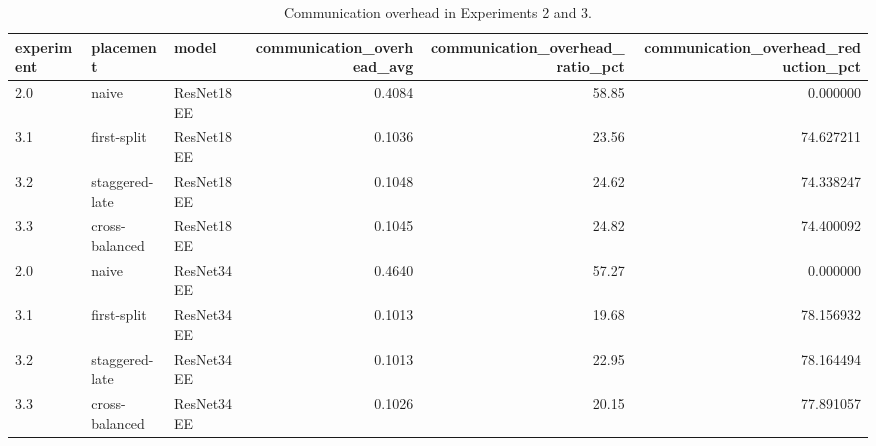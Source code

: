 \begin{table}
\centering
\caption{Communication overhead in Experiments 2 and 3.}
\label{tab:exp2-exp3-communication-overhead}
\begin{tabular}{lllrrr}
\toprule
experiment &      placement &      model &  communication\_overhead\_avg &  communication\_overhead\_ratio\_pct &  communication\_overhead\_reduction\_pct \\
\midrule
       2.0 &          naive & ResNet18EE &                      0.4084 &                             58.85 &                              0.000000 \\
       3.1 &    first-split & ResNet18EE &                      0.1036 &                             23.56 &                             74.627211 \\
       3.2 & staggered-late & ResNet18EE &                      0.1048 &                             24.62 &                             74.338247 \\
       3.3 & cross-balanced & ResNet18EE &                      0.1045 &                             24.82 &                             74.400092 \\
       2.0 &          naive & ResNet34EE &                      0.4640 &                             57.27 &                              0.000000 \\
       3.1 &    first-split & ResNet34EE &                      0.1013 &                             19.68 &                             78.156932 \\
       3.2 & staggered-late & ResNet34EE &                      0.1013 &                             22.95 &                             78.164494 \\
       3.3 & cross-balanced & ResNet34EE &                      0.1026 &                             20.15 &                             77.891057 \\
\bottomrule
\end{tabular}
\end{table}
